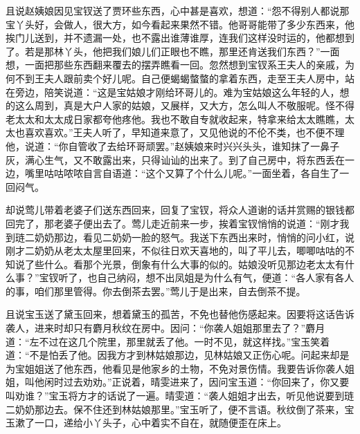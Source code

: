 \documentclass[12pt,oneside]{book}
\begin{document}
且说赵姨娘因见宝钗送了贾环些东西，心中甚是喜欢，想道：“怨不得别人都说那宝丫头好，会做人，很大方，如今看起来果然不错。他哥哥能带了多少东西来，他挨门儿送到，并不遗漏一处，也不露出谁薄谁厚，连我们这样没时运的，他都想到了。若是那林丫头，他把我们娘儿们正眼也不瞧，那里还肯送我们东西？”一面想，一面把那些东西翻来覆去的摆弄瞧看一回。忽然想到宝钗系王夫人的亲戚，为何不到王夫人跟前卖个好儿呢。自己便蝎蝎螫螫的拿着东西，走至王夫人房中，站在旁边，陪笑说道：“这是宝姑娘才刚给环哥儿的。难为宝姑娘这么年轻的人，想的这么周到，真是大户人家的姑娘，又展样，又大方，怎么叫人不敬服呢。怪不得老太太和太太成日家都夸他疼他。我也不敢自专就收起来，特拿来给太太瞧瞧，太太也喜欢喜欢。”王夫人听了，早知道来意了，又见他说的不伦不类，也不便不理他，说道：“你自管收了去给环哥顽罢。”赵姨娘来时兴兴头头，谁知抹了一鼻子灰，满心生气，又不敢露出来，只得讪讪的出来了。到了自己房中，将东西丢在一边，嘴里咕咕哝哝自言自语道：“这个又算了个什么儿呢。”一面坐着，各自生了一回闷气。　　

却说莺儿带着老婆子们送东西回来，回复了宝钗，将众人道谢的话并赏赐的银钱都回完了，那老婆子便出去了。莺儿走近前来一步，挨着宝钗悄悄的说道：“刚才我到琏二奶奶那边，看见二奶奶一脸的怒气。我送下东西出来时，悄悄的问小红，说刚才二奶奶从老太太屋里回来，不似往日欢天喜地的，叫了平儿去，唧唧咕咕的不知说了些什么。看那个光景，倒象有什么大事的似的。姑娘没听见那边老太太有什么事？”宝钗听了，也自己纳闷，想不出凤姐是为什么有气，便道：“各人家有各人的事，咱们那里管得。你去倒茶去罢。”莺儿于是出来，自去倒茶不提。

且说宝玉送了黛玉回来，想着黛玉的孤苦，不免也替他伤感起来。因要将这话告诉袭人，进来时却只有麝月秋纹在房中。因问：“你袭人姐姐那里去了？”麝月道：“左不过在这几个院里，那里就丢了他。一时不见，就这样找。”宝玉笑着道：“不是怕丢了他。因我方才到林姑娘那边，见林姑娘又正伤心呢。问起来却是为宝姐姐送了他东西，他看见是他家乡的土物，不免对景伤情。我要告诉你袭人姐姐，叫他闲时过去劝劝。”正说着，晴雯进来了，因问宝玉道：“你回来了，你又要叫劝谁？”宝玉将方才的话说了一遍。晴雯道：“袭人姐姐才出去，听见他说要到琏二奶奶那边去。保不住还到林姑娘那里。”宝玉听了，便不言语。秋纹倒了茶来，宝玉漱了一口，递给小丫头子，心中着实不自在，就随便歪在床上。
\end{document}
